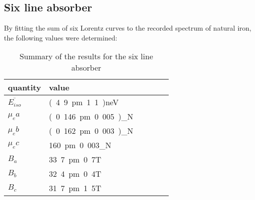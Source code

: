 \subsection{Six line absorber}
By fitting the sum of six Lorentz curves to the recorded spectrum of natural iron, the following values were determined:
\begin{table}[H]\centering
	\begin{tabular}{@{}llllll@{}}
		\toprule
		 quantity& value \\
		\midrule
		$\overline{E_{iso}}$ & \unit{(4.9\pm1.1)}{neV}\\
		$\mu_ea$ & \unit{(0.146\pm0.005)}{\mu_N} \\
		$\mu_eb$ & \unit{(0.162\pm0.003)}{\mu_N}\\
		$\mu_ec$ & \unit{160\pm0.003}{\mu_N}\\
		$B_a$ & \unit{33.7\pm0.7}{T}  \\
		$B_b$ & \unit{32.4\pm0.4}{T}  \\
		$B_c$ & \unit{31.7\pm1.5}{T}  \\ 
		\bottomrule
	\end{tabular}
	\caption[summary six line absorber]{Summary of the results for the six line absorber}
	\label{tb:summary:sixline abs}
\end{table}
